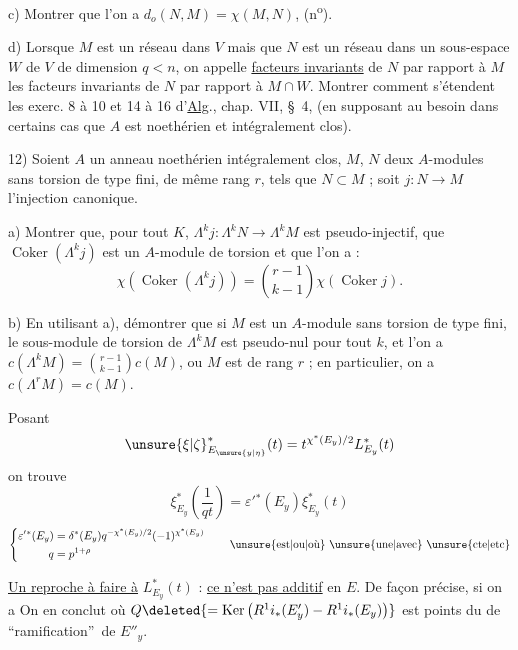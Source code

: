 c) Montrer que l'on a $d_o(N,M)=\chi(M,N)$, (n\textsuperscript{o}\quad).

d) Lorsque $M$ est un réseau dans $V$ mais que $N$ est un réseau dans un sous-espace $W$ de $V$ de dimension $q<n$, on appelle \uline{facteurs invariants} de $N$ par rapport à $M$ les facteurs invariants de $N$ par rapport à $M\cap W$. Montrer comment s'étendent les exerc. 8 à 10 et 14 à 16 d'\uline{Alg}., chap. VII, \S~4, (en supposant au besoin dans certains cas que $A$ est noethérien et intégralement clos).

12) Soient $A$ un anneau noethérien intégralement clos, $M$, $N$ deux $A$-modules sans torsion de type fini, de même rang $r$, tels que $N\subset M$ ; soit $j:N\longrightarrow M$ l'injection canonique.

a) Montrer que, pour tout $K$, $\Lambda^k j:\Lambda^k N\longrightarrow\Lambda^k M$ est pseudo-injectif, que $\operatorname{Coker}(\Lambda^k j)$ est un $A$-module de torsion et que l'on a :
\[
 \chi(\operatorname{Coker}(\Lambda^k j))=\binom{r-1}{k-1}\chi(\operatorname{Coker}j).
\]

b) En utilisant a), démontrer que si $M$ est un $A$-module sans torsion de type fini, le sous-module de torsion de $\Lambda^k M$ est pseudo-nul pour tout $k$, et l'on a $c(\Lambda^k M)=\binom{r-1}{k-1}c(M)$, o\rlap{\handwritten{\`{\phantom{u}}}}u $M$ est de rang $r$ ; en particulier, on a $c(\Lambda^r M)=c(M)$.

Posant
\[
 \unsure{\xi|\zeta}^{*}_{E_{\unsure{y|\eta}}}(t)=t^{\chi^*(E_y)/2}L^*_{E_y}(t)
\]
on trouve
\[
 \boxed{\xi^*_{E_y}\left(\frac{1}{qt}\right)=\varepsilon'{}^*(E_y)\xi^*_{E_y}(t)}
\]
\[
 \left\{\begin{aligned}
 \varepsilon'{}^*(E_y)&=\delta^*(E_y)q^{-\chi^*(E_y)/2}(-1)^{\chi^*(E_y)}\\
 q&=p^{1+\rho}
 \end{aligned}\right.
 \qquad\text{\unsure{est|ou|où} \unsure{une|avec} \unsure{cte|etc}}
\]

\uline{Un reproche à faire à} $L^*_{E_y}(t)$ : \uline{ce n'est pas additif} en $E$. De façon précise, si on a
On en  conclut
où $Q\deleted{=\operatorname{Ker}\left(R^1i_*(E'_y)\mathbin{-}R^1i_*(E_y)\right)}$
est    points du  de \textquotedblleft ramification\textquotedblright\ de $E''_y$.

